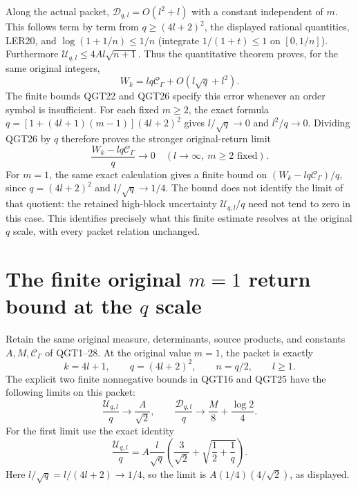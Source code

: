 \documentclass[11pt,a4paper]{article}
\begin{document}
Along the actual packet, $\mathcal D_{q,l}=O(l^2+l)$ with a constant
independent of $m$. This follows term by term from
$q\ge(4l+2)^2$, the displayed rational quantities, LER20, and
$\log(1+1/n)\le1/n$ (integrate $1/(1+t)\le1$ on $[0,1/n]$).
Furthermore $\mathcal U_{q,l}\le4Al\sqrt{n+1}$.
Thus the quantitative theorem proves, for the same original integers,
\[
 \boxed{W_k=lq\mathcal C_\Gamma+O(l\sqrt q+l^2).}
 \tag{QGT27}
\]
The finite bounds QGT22 and QGT26 specify this error whenever an
order symbol is insufficient.
For each fixed $m\ge2$, the exact formula
$q=[1+(4l+1)(m-1)](4l+2)^2$ gives
$l/\sqrt q\to0$ and $l^2/q\to0$. Dividing QGT26 by $q$ therefore
proves the stronger original-return limit
\[
 \boxed{\frac{W_k-lq\mathcal C_\Gamma}{q}\longrightarrow0
                        \quad(l\to\infty,\ m\ge2\text{ fixed}).}
 \tag{QGT28}
\]
For $m=1$, the same exact calculation gives a finite bound on
$(W_k-lq\mathcal C_\Gamma)/q$, since $q=(4l+2)^2$ and
$l/\sqrt q\to1/4$. The bound does not identify the limit of that
quotient: the retained high-block uncertainty
$\mathcal U_{q,l}/q$ need not tend to zero in this case.
This identifies precisely what this finite estimate resolves at the
original $q$ scale, with every packet relation unchanged.



\section{The finite original \(m=1\) return bound at the \(q\) scale}
\label{sec:QGQ}

Retain the same original measure, determinants, source products, and
constants $A,M,\mathcal C_\Gamma$ of QGT1--28. At the original value
$m=1$, the packet is exactly
\[
 k=4l+1,\qquad q=(4l+2)^2,\qquad n=q/2,\qquad l\ge1.
 \tag{QGQ1}
\]
The explicit two finite nonnegative bounds in QGT16 and QGT25 have
the following limits on this packet:
\[
 \frac{\mathcal U_{q,l}}q\longrightarrow\frac A{\sqrt2},
 \qquad
 \frac{\mathcal D_{q,l}}q\longrightarrow
                  \frac M8+\frac{\log2}{4}.
 \tag{QGQ2}
\]
For the first limit use the exact identity
\[
 \frac{\mathcal U_{q,l}}q
 = A\frac l{\sqrt q}
          \left(\frac3{\sqrt2}+\sqrt{\frac12+\frac1q}\right).
\]
Here $l/\sqrt q=l/(4l+2)\to1/4$, so the limit is
$A(1/4)(4/\sqrt2)$, as displayed.
\end{document}
